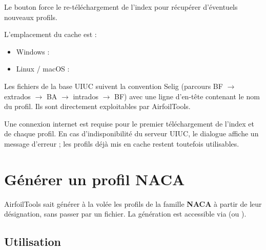 Le bouton  force le re-téléchargement de
l'index pour récupérer d'éventuels nouveaux profils.

L'emplacement du cache est :

\begin{itemize}
    \item Windows : 
    \item Linux / macOS : 
\end{itemize}

\begin{noteinfo}
Les fichiers  de la base UIUC suivent la
convention Selig (parcours BF $\rightarrow$ extrados $\rightarrow$
BA $\rightarrow$ intrados $\rightarrow$ BF) avec une ligne
d'en-tête contenant le nom du profil. Ils sont directement
exploitables par AirfoilTools.
\end{noteinfo}

\begin{attention}
Une connexion internet est requise pour le premier
téléchargement de l'index et de chaque profil. En cas
d'indisponibilité du serveur UIUC, le dialogue affiche un
message d'erreur ; les profils déjà mis en cache restent
toutefois utilisables.
\end{attention}

\section{Générer un profil NACA}
\label{sec:naca}

AirfoilTools sait générer à la volée les profils de la famille
\textbf{NACA} à partir de leur désignation, sans passer par un
fichier. La génération est accessible via  (ou
).


\subsection{Utilisation}

